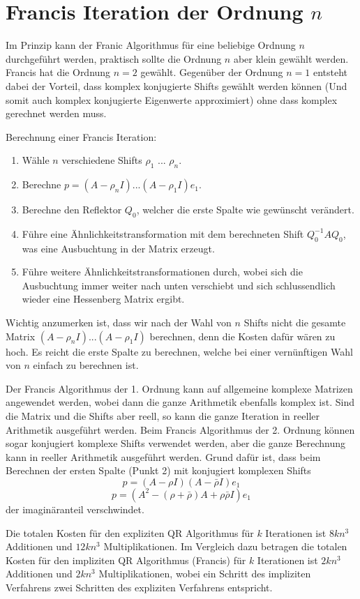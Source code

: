 \section{Francis Iteration der Ordnung $n$}

Im Prinzip kann der Franic Algorithmus für eine beliebige Ordnung $n$ durchgeführt werden, praktisch sollte die Ordnung $n$ aber klein gewählt werden.
Francis hat die Ordnung $n=2$ gewählt.
Gegenüber der Ordnung $n=1$ entsteht dabei der Vorteil, dass komplex konjugierte Shifts gewählt werden können (Und somit auch komplex konjugierte Eigenwerte approximiert) ohne dass komplex gerechnet werden muss.

Berechnung einer Francis Iteration:
\begin{enumerate}
	\item Wähle $n$ verschiedene Shifts $\rho_{1}$ ... $\rho_{n}$.
	\item Berechne $p= (A - \rho_{n}I) ... (A - \rho_{1}I)e_{1}$.
	\item Berechne den Reflektor $Q_{0}$, welcher die erste Spalte wie gewünscht verändert.
	\item Führe eine Ähnlichkeitstransformation mit dem berechneten Shift $Q_{0}^{-1}AQ_{0}$, was eine Ausbuchtung in der Matrix erzeugt.
	\item Führe weitere Ähnlichkeitstransformationen durch, wobei sich die Ausbuchtung immer weiter nach unten verschiebt und sich schlussendlich wieder eine Hessenberg Matrix ergibt.
\end{enumerate}

Wichtig anzumerken ist, dass wir nach der Wahl von $n$ Shifts nicht die gesamte Matrix $(A - \rho_{n}I) ... (A - \rho_{1}I)$ berechnen, denn die Kosten dafür wären zu hoch. Es reicht die erste Spalte zu berechnen, welche bei einer vernünftigen Wahl von $n$ einfach zu berechnen ist.

Der Francis Algorithmus der 1. Ordnung kann auf allgemeine komplexe Matrizen angewendet werden, wobei dann die ganze Arithmetik ebenfalls komplex ist.
Sind die Matrix und die Shifts aber reell, so kann die ganze Iteration in reeller Arithmetik ausgeführt werden.
Beim Francis Algorithmus der 2. Ordnung können sogar konjugiert komplexe Shifts verwendet werden, aber die ganze Berechnung kann in reeller Arithmetik ausgeführt werden. Grund dafür ist, dass beim Berechnen der ersten Spalte (Punkt 2) mit konjugiert komplexen Shifts
\begin{equation}
p= (A - \rho I)(A - \bar{\rho} I)e_{1}
\end{equation}
\begin{equation}
p= (A^2-(\rho+\bar{\rho})A+\rho\bar{\rho}I)e_{1}
\end{equation}
der imaginäranteil verschwindet.

Die totalen Kosten für den expliziten QR Algorithmus für $k$ Iterationen ist $8kn^{3}$ Additionen und $12kn^{3}$ Multiplikationen.
Im Vergleich dazu betragen die totalen Kosten für den impliziten QR Algorithmus (Francis) für $k$ Iterationen ist $2kn^{3}$ Additionen und $2kn^{3}$ Multiplikationen, wobei ein Schritt des impliziten Verfahrens zwei Schritten des expliziten Verfahrens entspricht. \cite{francis:EthSeminar}
